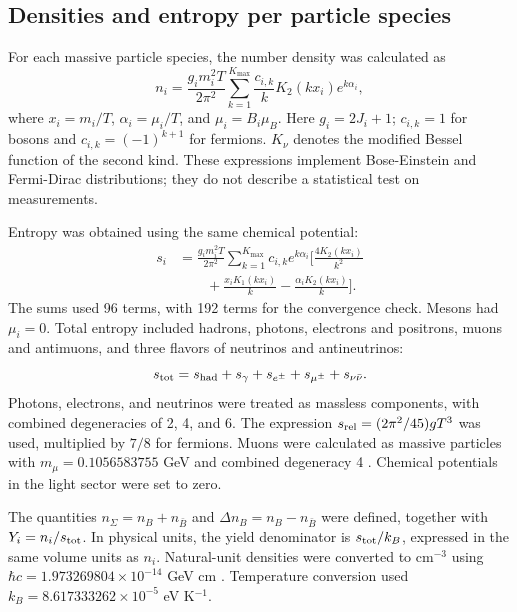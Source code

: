 \subsection{Densities and entropy per particle species}
For each massive particle species, the number density was calculated as
\begin{equation}
n_i=\frac{g_i m_i^2T}{2\pi^2}
\sum_{k=1}^{K_{\max}}\frac{c_{i,k}}{k}
K_2(kx_i)e^{k\alpha_i},\label{eq:number}
\end{equation}
where $x_i=m_i/T$, $\alpha_i=\mu_i/T$, and $\mu_i=B_i\mu_B$. Here $g_i=2J_i+1$; $c_{i,k}=1$ for bosons and $c_{i,k}=(-1)^{k+1}$ for fermions. $K_\nu$ denotes the modified Bessel function of the second kind. These expressions implement Bose-Einstein and Fermi-Dirac distributions; they do not describe a statistical test on measurements.

Entropy was obtained using the same chemical potential:
\begin{align}
s_i&=\frac{g_i m_i^2T}{2\pi^2}
\sum_{k=1}^{K_{\max}}c_{i,k}e^{k\alpha_i}\bigg[
\frac{4K_2(kx_i)}{k^2}\nonumber\\
&\qquad+\frac{x_iK_1(kx_i)}{k}
-\frac{\alpha_iK_2(kx_i)}{k}\bigg].\label{eq:entropy}
\end{align}
The sums used 96 terms, with 192 terms for the convergence check. Mesons had $\mu_i=0$. Total entropy included hadrons, photons, electrons and positrons, muons and antimuons, and three flavors of neutrinos and antineutrinos:
\begin{equation}
s_{\rm tot}=s_{\rm had}+s_\gamma+s_{e^\pm}
+s_{\mu^\pm}+s_{\nu\bar\nu}.\label{eq:stotal}
\end{equation}
Photons, electrons, and neutrinos were treated as massless components, with combined degeneracies of 2, 4, and 6. The expression $s_{\rm rel}=(2\pi^2/45)gT^3$ was used, multiplied by $7/8$ for fermions. Muons were calculated as massive particles with $m_\mu=0.1056583755$ GeV and combined degeneracy 4 \citep{PDG2025}. Chemical potentials in the light sector were set to zero.

The quantities $n_\Sigma=n_B+n_{\bar B}$ and $\Delta n_B=n_B-n_{\bar B}$ were defined, together with $Y_i=n_i/s_{\rm tot}$. In physical units, the yield denominator is $s_{\rm tot}/k_B$, expressed in the same volume units as $n_i$. Natural-unit densities were converted to cm$^{-3}$ using $\hbar c=1.973269804\times10^{-14}$ GeV cm \citep{Robinson2025}. Temperature conversion used $k_B=8.617333262\times10^{-5}$ eV K$^{-1}$.

